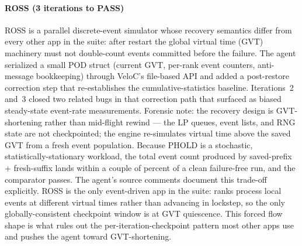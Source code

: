 \documentclass[conference]{IEEEtran}
\begin{document}
\paragraph{ROSS (3 iterations to PASS)}
ROSS is a parallel discrete-event simulator whose recovery semantics differ from every other app in the suite: after restart the global virtual time (GVT) machinery must not double-count events committed before the failure. The agent serialized a small POD struct (current GVT, per-rank event counters, anti-message bookkeeping) through VeloC's file-based API and added a post-restore correction step that re-establishes the cumulative-statistics baseline. Iterations~2 and~3 closed two related bugs in that correction path that surfaced as biased steady-state event-rate measurements. Forensic note: the recovery design is GVT-shortening rather than mid-flight rewind --- the LP queues, event lists, and RNG state are not checkpointed; the engine re-simulates virtual time above the saved GVT from a fresh event population. Because PHOLD is a stochastic, statistically-stationary workload, the total event count produced by saved-prefix + fresh-suffix lands within a couple of percent of a clean failure-free run, and the comparator passes. The agent's source comments document this trade-off explicitly. ROSS is the only event-driven app in the suite: ranks process local events at different virtual times rather than advancing in lockstep, so the only globally-consistent checkpoint window is at GVT quiescence. This forced flow shape is what rules out the per-iteration-checkpoint pattern most other apps use and pushes the agent toward GVT-shortening.
\end{document}

